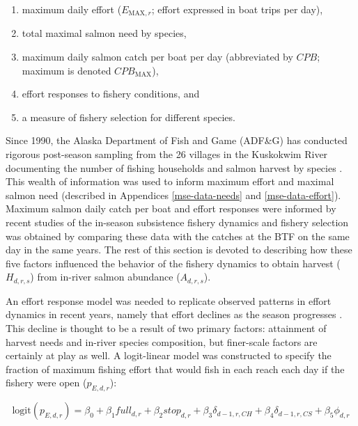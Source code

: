 \documentclass[12pt,]{book}
\theoremstyle{definition}
\theoremstyle{definition}
\theoremstyle{definition}
\theoremstyle{remark}
\begin{document}
\begin{enumerate}
\def\labelenumi{(\arabic{enumi})}
\item
  maximum daily effort (\(E_{\text{MAX},r}\); effort expressed in boat
  trips per day),
\item
  total maximal salmon need by species,
\item
  maximum daily salmon catch per boat per day (abbreviated by \(CPB\);
  maximum is denoted \(CPB_{\text{MAX}}\)),
\item
  effort responses to fishery conditions, and
\item
  a measure of fishery selection for different species.
\end{enumerate}

\noindent
Since 1990, the Alaska Department of Fish and Game (ADF\&G) has
conducted rigorous post-season sampling from the 26 villages in the
Kuskokwim River documenting the number of fishing households and salmon
harvest by species \citetext{\citealp[these estimates are presented
in][]{hamazaki-2011}; \citealp{carroll-hamazaki-2012}; \citealp{shelden-etal-2014}; \citealp{shelden-etal-2015}; \citealp{shelden-etal-2016a}; \citealp[and][]{shelden-etal-2016b}}.
This wealth of information was used to inform maximum effort and maximal
salmon need (described in Appendices \ref{mse-data-needs} and
\ref{mse-data-effort}). Maximum salmon daily catch per boat and effort
responses were informed by recent studies of the in-season subsistence
fishery dynamics
\citep{staton-coggins-2016, staton-coggins-2017, staton-2018} and
fishery selection was obtained by comparing these data with the catches
at the BTF on the same day in the same years. The rest of this section
is devoted to describing how these five factors influenced the behavior
of the fishery dynamics to obtain harvest (\(H_{d,r,s}\)) from in-river
salmon abundance (\(A_{d,r,s}\)).

An effort response model was needed to replicate observed patterns in
effort dynamics in recent years, namely that effort declines as the
season progresses
\citep{staton-coggins-2016, staton-coggins-2017, staton-2018}. This
decline is thought to be a result of two primary factors: attainment of
harvest needs and in-river species composition, but finer-scale factors
are certainly at play as well. A logit-linear model was constructed to
specify the fraction of maximum fishing effort that would fish in each
reach each day if the fishery were open (\(p_{E,d,r}\)):

\begin{equation}
  \text{logit}(p_{E,d,r})=\beta_0 + \beta_1 full_{d,r} + \beta_2 stop_{d,r} + \beta_3 \delta_{d-1,r,CH} + \beta_4 \delta_{d-1,r,CS} + \beta_5 \phi_{d,r}
  \label{eq:effort-response}
\end{equation}
\end{document}
